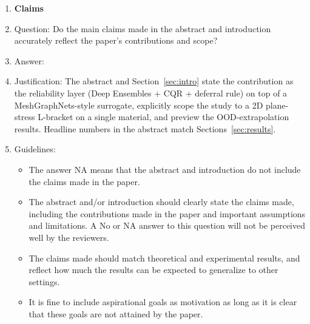 \documentclass{article}
\begin{document}
\begin{enumerate}

\item {\bf Claims}
    \item[] Question: Do the main claims made in the abstract and introduction accurately reflect the paper's contributions and scope?
    \item[] Answer: \answerYes{}
    \item[] Justification: The abstract and Section~\ref{sec:intro} state the contribution as the reliability layer (Deep Ensembles + CQR + deferral rule) on top of a MeshGraphNets-style surrogate, explicitly scope the study to a 2D plane-stress L-bracket on a single material, and preview the OOD-extrapolation results. Headline numbers in the abstract match Sections~\ref{sec:results}.
    \item[] Guidelines:
    \begin{itemize}
        \item The answer NA means that the abstract and introduction do not include the claims made in the paper.
        \item The abstract and/or introduction should clearly state the claims made, including the contributions made in the paper and important assumptions and limitations. A No or NA answer to this question will not be perceived well by the reviewers.
        \item The claims made should match theoretical and experimental results, and reflect how much the results can be expected to generalize to other settings.
        \item It is fine to include aspirational goals as motivation as long as it is clear that these goals are not attained by the paper.
    \end{itemize}


\end{enumerate}
\end{document}
